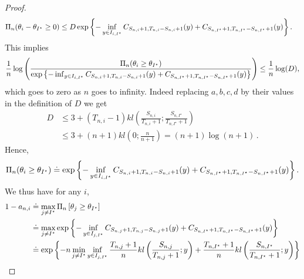 \begin{proof}
	\begin{align*}
	\Pi_{n}(\theta_i - \theta_{I^\star} \geq 0) &\leq D \exp\left\{- \inf_{y \in I_{i,I^\star} } C_{S_{n,i}+1,T_{n,i}-S_{n,i}+1}(y)+C_{S_{n,I^\star}+1,T_{n,I^\star}-S_{n,I^\star}+1}(y)\right\}.
	\end{align*}
This implies
	\begin{align*}
	\frac{1}{n} \log \left( \frac{\Pi_{n}(\theta_i \geq \theta_{I^\star})}{\exp\left\{ - \inf_{y \in I_{i,I^\star} } C_{S_{n,i}+1,T_{n,i}-S_{n,i}+1}(y)+C_{S_{n,I^\star}+1,T_{n,I^\star}-S_{n,I^\star}+1}(y) \right\}} \right) \leq \frac{1}{n} \log(D),
	\end{align*}
	which goes to zero as $n$ goes to infinity. Indeed replacing $a,b,c,d$ by their values in the definition of $D$ we get
	\begin{align*}
	    D&\leq 3 + (T_{n,i}-1) kl \left( \frac{S_{n,i}}{T_{n,i}+1};   \frac{S_{n,I^\star}}{T_{n,I^\star}+1}\right)\\
	    &\leq 3 + (n+1) kl\left(0; \frac{n}{n+1} \right) = (n+1)\log(n+1)\,. 
	\end{align*}
Hence,
\[
\Pi_{n}(\theta_i \geq \theta_{I^\star}) \doteq \exp\left\{ - \inf_{y \in I_{i,I^\star}}  C_{S_{n,i}+1,T_{n,i}-S_{n,i}+1}(y)+C_{S_{n,I^\star}+1,T_{n,I^\star}-S_{n,I^\star}+1}(y) \right\}.
\]
We thus have for any $i$,
\begin{align*}
1 - a_{n,i} &\doteq \max_{j \neq I^\star} \Pi_{n}\left[\theta_j \geq \theta_{I^\star}\right] \\
&\doteq \max_{j \neq I^\star} \expp{ - \inf_{y \in I_{j,I^\star} } C_{S_{n,j}+1,T_{n,j}-S_{n,j}+1}(y)+C_{S_{n,I^\star}+1,T_{n,I^\star}-S_{n,I^\star}+1}(y)}\\
&\doteq  \expp{ - n \min_{j \neq I^\star} \inf_{y \in I_{j,I^\star} } \frac{T_{n,j} +1}{n} kl\left(\frac{S_{n,j}}{T_{n,j}+1}; y\right) + \frac{T_{n,I^\star} +1}{n} kl\left(\frac{S_{n,I^\star}}{T_{n,I^\star}+1} ; y\right) }\\

\end{align*}
\end{proof}
